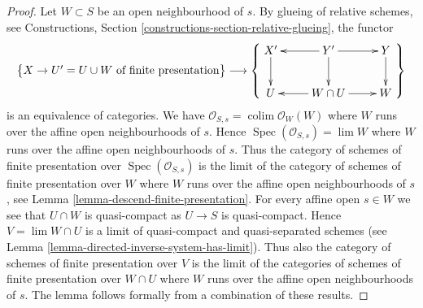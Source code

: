 \documentclass[10pt,a4paper]{amsart}
\theoremstyle{plain}
\theoremstyle{definition}
\theoremstyle{remark}
\numberwithin{equation}{subsection}
\def\lim{\mathop{\mathrm{lim}}\nolimits}
\def\colim{\mathop{\mathrm{colim}}\nolimits}
\def\Spec{\mathop{\mathrm{Spec}}}
\begin{document}
\begin{proof}
Let $W \subset S$ be an open neighbourhood of $s$. By
glueing of relative schemes, see
Constructions, Section \ref{constructions-section-relative-glueing},
the functor
$$
\left\{
\begin{matrix}
X \to U' = U \cup W \text{ of finite presentation}
\end{matrix}
\right\}
\longrightarrow
\left\{
\vcenter{
\xymatrix{
X' \ar[d] & Y' \ar[d] \ar[l] \ar[r] & Y \ar[d] \\
U & W \cap U \ar[l] \ar[r] & W
}
}
\right\}
$$
is an equivalence of categories. We have
$\mathcal{O}_{S, s} = \colim \mathcal{O}_W(W)$ where
$W$ runs over the affine open neighbourhoods of $s$.
Hence $\Spec(\mathcal{O}_{S, s}) = \lim W$ where $W$
runs over the affine open neighbourhoods of $s$.
Thus the category of schemes of finite presentation
over $\Spec(\mathcal{O}_{S, s})$ is the limit of the
category of schemes of finite presentation over
$W$ where $W$ runs over the affine open neighbourhoods
of $s$, see
Lemma \ref{lemma-descend-finite-presentation}.
For every affine open $s \in W$ we see that $U \cap W$
is quasi-compact as $U \to S$ is quasi-compact.
Hence $V = \lim W \cap U$ is a limit of
quasi-compact and quasi-separated schemes (see
Lemma \ref{lemma-directed-inverse-system-has-limit}).
Thus also the category of schemes of finite presentation
over $V$ is the limit of the
categories of schemes of finite presentation over
$W \cap U$ where $W$ runs over the affine open neighbourhoods
of $s$. The lemma follows formally from a combination
of these results.
\end{proof}
\end{document}
